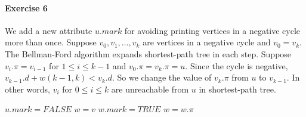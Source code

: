 \documentclass{book}
\begin{document}
	\paragraph{Exercise 6}
	We add a new attribute $u.mark$ for avoiding printing vertices in a negative cycle more than once. Suppose $v_0, v_1, \dots, v_k$ are vertices in a negative cycle and $v_0 = v_k$. The Bellman-Ford algorithm expands shortest-path tree in each step. Suppose $v_i.\pi = v_{i - 1}$ for $1 \le i \le k - 1$ and $v_0.\pi = v_k.\pi = u$. Since the cycle is negative, $v_{k - 1}.d + w(k - 1, k) < v_k.d$. So we change the value of $v_k.\pi$ from $u$ to $v_{k - 1}$. In other words, $v_i$ for $0 \le i \le k$ are unreachable from $u$ in shortest-path tree.
	\begin{algorithm*}[h!]
		\begin{algorithmic}[1]
				\State {}
						\State {}
					\EndFor
				\EndFor
					\State $u.mark = FALSE$
				\EndFor
						\State $w = v$
							\State $w.mark = TRUE$
							\State {}
							\State $w = w.\pi$
						\EndWhile
					\EndIf
				\EndFor
			\EndFunction
		\end{algorithmic}
	\end{algorithm*}
	\FloatBarrier	
\end{document}
